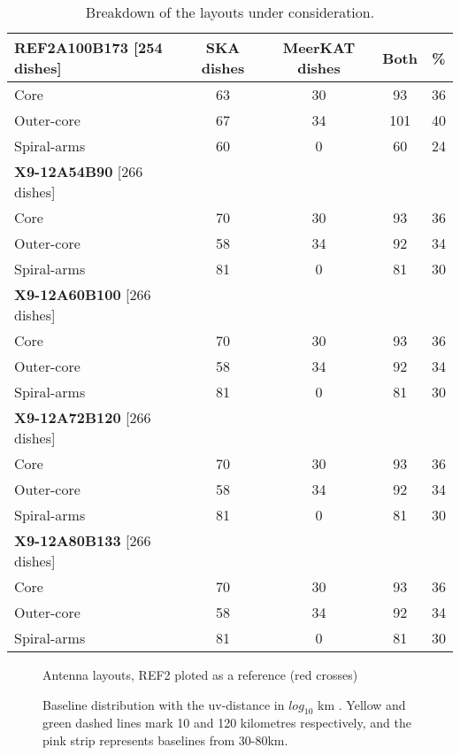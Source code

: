 \documentclass[sfheadings,a4paper,10pt,floats,floatfix]{article}
\begin{document}
\begin{table}[H]
\centering
 \tiny{
 \begin{tabular}{l|cccc}\hline
 {\bf REF2A100B173} [254 dishes] & SKA dishes&  MeerKAT dishes & Both & \% \\\hline\hline
  Core & 63 & 30 & 93 & 36 \\
 Outer-core & 67 & 34 & 101 & 40 \\
 Spiral-arms & 60 & 0 & 60 & 24 \\\hline\hline
  {\bf X9-12A54B90} [266 dishes] &  & &  & \\\hline\hline
  Core & 70 & 30 & 93 & 36 \\
 Outer-core & 58 & 34 & 92 & 34 \\
 Spiral-arms & 81 & 0 & 81 & 30 \\\hline\hline
  {\bf X9-12A60B100} [266 dishes] &  & &  & \\\hline\hline
  Core & 70 & 30 & 93 & 36 \\
 Outer-core & 58 & 34 & 92 & 34 \\
 Spiral-arms & 81 & 0 & 81 & 30 \\\hline\hline
  {\bf X9-12A72B120} [266 dishes] &  & &  & \\\hline\hline
  Core & 70 & 30 & 93 & 36 \\
 Outer-core & 58 & 34 & 92 & 34 \\
 Spiral-arms & 81 & 0 & 81 & 30 \\\hline\hline
   {\bf X9-12A80B133} [266 dishes] &  & &  & \\\hline\hline
  Core & 70 & 30 & 93 & 36 \\
 Outer-core & 58 & 34 & 92 & 34 \\
 Spiral-arms & 81 & 0 & 81 & 30 \\\hline
 \end{tabular}}
 \caption{Breakdown of the layouts under consideration.}\label{tab:lay}
\end{table}

\begin{figure}[H]
 \tiny{}
 \caption{Antenna layouts, REF2 ploted as a reference (red crosses)}\label{fig:lay}
\end{figure}
\begin{figure}[H]
 \tiny{}
 \caption{Baseline distribution with the uv-distance in $log_{10}$ km . Yellow and green dashed lines mark 10 and 120
kilometres respectively, and the pink strip represents baselines from 30-80km.}\label{fig:hist}
\end{figure}
\end{document}
